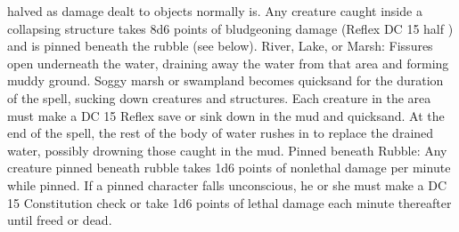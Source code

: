 halved as damage dealt to objects normally is. Any creature caught inside a collapsing
structure takes 8d6 points of bludgeoning damage (Reflex DC 15 half ) and is pinned
beneath the rubble (see below).
River, Lake, or Marsh: Fissures open underneath the water, draining away
the water from that area and forming muddy ground. Soggy marsh or swampland becomes
quicksand for the duration of the spell, sucking down creatures and structures.
Each creature in the area must make a DC 15 Reflex save or sink down in the mud
and quicksand. At the end of the spell, the rest of the body of water rushes in
to replace the drained water, possibly drowning those caught in the mud.
Pinned beneath Rubble: Any creature pinned beneath rubble takes 1d6 points
of nonlethal damage per minute while pinned. If a pinned character falls unconscious,
he or she must make a DC 15 Constitution check or take 1d6 points of lethal damage
each minute thereafter until freed or dead.